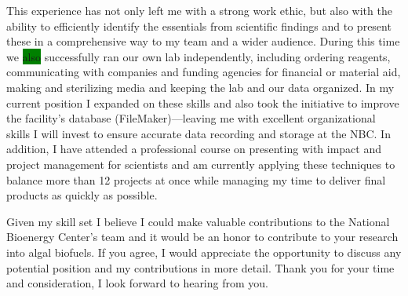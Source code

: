 \documentclass[11pt,a4paper,sans]{moderncv}
\begin{document}
\begin{spacing}{1.15}
This experience has not only left me with a strong work ethic, but also with the ability to efficiently identify the essentials from scientific findings and to present these in a comprehensive way to my team and a wider audience.
During this time we \colorbox{green}{also}%
successfully ran our own lab independently, including ordering reagents, communicating with companies and funding agencies for financial or material aid, making and sterilizing media and keeping the lab and our data organized. 
In my current position I expanded on these skills and also took the initiative to improve the facility's database (FileMaker)---leaving me with excellent organizational skills I will invest to ensure accurate data recording and storage at the NBC.
In addition, I have attended a professional course on presenting with impact and project management for scientists and am currently applying these techniques to balance more than 12  projects at once while managing my time to deliver final products as quickly as possible.
\par%

Given my skill set I believe I could make valuable contributions to the National Bioenergy Center's team and it would be an honor to contribute to your research into algal biofuels. 
If you agree, I would appreciate the opportunity to discuss any potential position and my contributions in more detail. 
Thank you for your time and consideration, I look forward to hearing from you.


 

\end{spacing}
\makeletterclosing
\end{document}

